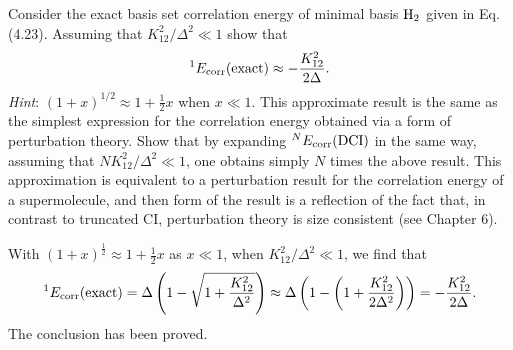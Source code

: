 \documentclass[a4paper]{book}
\newcommand{\corr}{{\rm corr}}
\begin{document}
	\begin{exercise}
	Consider the exact basis set correlation energy of minimal basis $\ce{H2}$ given in Eq.(4.23). Assuming that $K^2_{12}/\Delta^2 \ll 1$ show that
	\[
		{}^{1} E_\corr ({\rm exact}) \approx -\frac{K^2_{12}}{2\Delta}.
	\]
	{\it Hint}: $(1+x)^{1/2} \approx 1 + \frac{1}{2}x$ when $x \ll 1$. This approximate result is the same as the simplest expression for the correlation energy obtained via a form of perturbation theory. Show that by expanding ${}^{N} E_\corr ({\rm DCI})$ in the same way, assuming that $N K^2_{12} / \Delta^2 \ll 1$, one obtains simply $N$ times the above result. This approximation is equivalent to a perturbation result for the correlation energy of a supermolecule, and then form of the result is a reflection of the fact that, in contrast to truncated CI, perturbation theory is size consistent (see Chapter 6).
	\end{exercise}
	
	\begin{solution}
	
	With $(1+x)^{\frac{1}{2}} \approx 1+\frac{1}{2} x$ as $x \ll 1$, when $K^2_{12}/\Delta^2 \ll 1$, we find that
	\[
		^1 E_\corr ({\rm exact}) = \Delta \left( 1 - \sqrt{ 1 + \frac{ K^2_{12} }{ \Delta^2 } } \right) \approx \Delta \left( 1 - \left( 1 + \frac{ K^2_{12} }{ 2\Delta^2 } \right) \right) = -\frac{ K^2_{12} }{ 2\Delta }.
	\]
	The conclusion has been proved.
		
	\end{solution}
	
\end{document}
